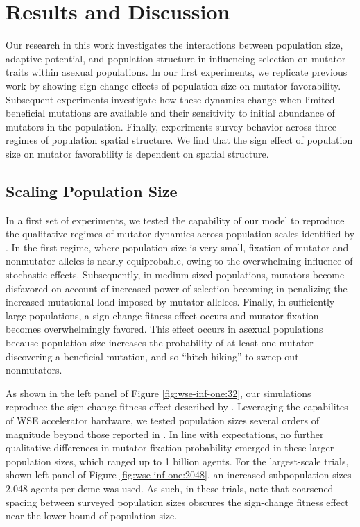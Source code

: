\section{Results and Discussion} \label{sec:results}

Our research in this work investigates the interactions between population size, adaptive potential, and population structure in influencing selection on mutator traits within asexual populations.
In our first experiments, we replicate previous work by \citet{raynes2018sign} showing sign-change effects of population size on mutator favorability.
Subsequent experiments investigate how these dynamics change when limited beneficial mutations are available and their sensitivity to initial abundance of mutators in the population.
Finally, experiments survey behavior across three regimes of population spatial structure.
We find that the sign effect of population size on mutator favorability is dependent on spatial structure.

\subsection{Scaling Population Size}
\label{sec:scaling-population-size}

In a first set of experiments, we tested the capability of our model to reproduce the qualitative regimes of mutator dynamics across population scales identified by \citet{raynes2018sign}.
In the first regime, where population size is very small, fixation of mutator and nonmutator alleles is nearly equiprobable, owing to the overwhelming influence of stochastic effects.
Subsequently, in medium-sized populations, mutators become disfavored on account of increased power of selection becoming in penalizing the increased mutational load imposed by mutator allelees.
Finally, in sufficiently large populations, a sign-change fitness effect occurs and mutator fixation becomes overwhelmingly favored.
This effect occurs in asexual populations because population size increases the probability of at least one mutator discovering a beneficial mutation, and so ``hitch-hiking'' to sweep out nonmutators.



As shown in the left panel of Figure \ref{fig:wse-inf-one:32}, our simulations reproduce the sign-change fitness effect described by \citet{raynes2018sign}.
Leveraging the capabilites of WSE accelerator hardware, we tested population sizes several orders of magnitude beyond those reported in \citet{raynes2018sign}.
In line with expectations, no further qualitative differences in mutator fixation probability emerged in these larger population sizes, which ranged up to 1 billion agents.
For the largest-scale trials, shown left panel of Figure \ref{fig:wse-inf-one:2048}, an increased subpopulation sizes 2,048 agents per deme was used.
As such, in these trials, note that coarsened spacing between surveyed population sizes obscures the sign-change fitness effect near the lower bound of population size.

